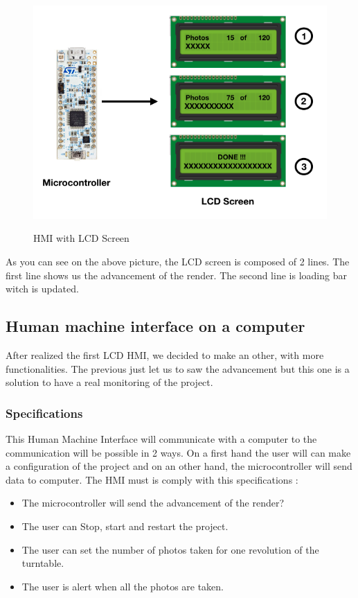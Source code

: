 \begin{figure}[h]
  \centering
  \includegraphics[scale=0.45]{img/LCD_IHM.png}\\%
  \caption{HMI with LCD Screen }
  \label{fig:LogoTachyssema}
\end{figure}

As you can see on the above picture, the LCD screen is composed of 2 lines. The first line shows us the advancement of the render. The second line is loading bar witch is updated. 
\subsection {Human machine interface on a computer  } 

After realized the first LCD HMI, we decided to make an other, with more functionalities. The previous just let us to saw the advancement but this one is a solution to have a real monitoring of the project.  

\subsubsection {Specifications  } 

This Human Machine Interface will communicate with a computer to the communication will be possible in 2 ways. On a first hand the user will can make a configuration of the project and on an other hand, the microcontroller will send data to computer. 
The HMI must is comply with this specifications : 
\newline
\begin{itemize}
  \item The microcontroller will send the advancement of the render?
  \item The user can Stop, start and restart the project.
  \item The user can set the number of photos taken for one revolution of the turntable.
  \item The user is alert when all the photos are taken. 
  \end{itemize}


